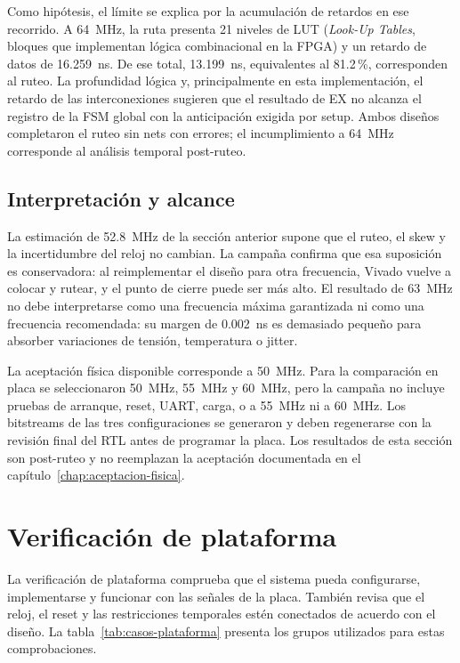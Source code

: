 Como hipótesis, el límite se explica por la acumulación de retardos en ese
recorrido. A \SI{64}{\mega\hertz}, la ruta presenta 21 niveles de LUT
(\emph{Look-Up Tables}, bloques que implementan lógica combinacional en la
FPGA) y un retardo de datos de \SI{16.259}{\nano\second}. De ese total,
\SI{13.199}{\nano\second}, equivalentes al \num{81.2}\,\%, corresponden al
ruteo. La profundidad lógica y, principalmente en esta implementación, el
retardo de las interconexiones sugieren que el resultado de EX no alcanza el
registro de la FSM global con la anticipación exigida por setup. Ambos diseños
completaron el ruteo sin nets con errores; el incumplimiento a
\SI{64}{\mega\hertz} corresponde al análisis temporal post-ruteo.

\subsection{Interpretación y alcance}

La estimación de \SI{52.8}{\mega\hertz} de la sección anterior supone que el
ruteo, el skew y la incertidumbre del reloj no cambian. La campaña confirma que
esa suposición es conservadora: al reimplementar el diseño para otra frecuencia,
Vivado vuelve a colocar y rutear, y el punto de cierre puede ser más alto. El
resultado de \SI{63}{\mega\hertz} no debe interpretarse como una frecuencia
máxima garantizada ni como una frecuencia recomendada: su margen de
\SI{0.002}{\nano\second} es demasiado pequeño para absorber variaciones de
tensión, temperatura o jitter.

La aceptación física disponible corresponde a \SI{50}{\mega\hertz}. Para la
comparación en placa se seleccionaron \SI{50}{\mega\hertz},
\SI{55}{\mega\hertz} y \SI{60}{\mega\hertz}, pero la campaña no incluye pruebas
de arranque, reset, UART, carga,  o  a \SI{55}{\mega\hertz}
ni a \SI{60}{\mega\hertz}. Los bitstreams de las tres configuraciones se
generaron y deben regenerarse con la revisión final del RTL antes de programar
la placa. Los resultados de esta sección son post-ruteo y no reemplazan la
aceptación documentada en el capítulo~\ref{chap:aceptacion-fisica}.

\section{Verificación de plataforma}

La verificación de plataforma comprueba que el sistema pueda configurarse,
implementarse y funcionar con las señales de la placa. También revisa que el
reloj, el reset y las restricciones temporales estén conectados de acuerdo con
el diseño. La tabla~\ref{tab:casos-plataforma} presenta los grupos utilizados
para estas comprobaciones.

